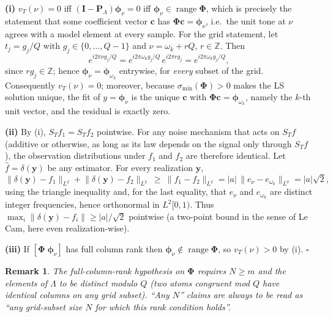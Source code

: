 \documentclass[10pt]{article}
\newtheorem{remark}{Remark}
\DeclareMathOperator{\range}{range}
\newcommand{\Z}{\mathbb{Z}}
\newcommand{\Lam}{\Lambda}
\newcommand{\Phimat}{\bm{\Phi}}
\newcommand{\norm}[1]{\lVert#1\rVert}
\newcommand{\vt}{v_T}
\begin{document}
\textbf{(i)}  $\vt(\nu)=0$ iff $(\bm I-\bm P_\Lam)\bm\phi_\nu=0$ iff
$\bm\phi_\nu\in\range\Phimat$, which is precisely the statement that some coefficient
vector $\bm c$ has $\Phimat\bm c=\bm\phi_\nu$, i.e.\ the unit tone at $\nu$ agrees with a
model element at every sample.  For the grid statement, let $t_j=g_j/Q$ with
$g_j\in\{0,\dots,Q-1\}$ and $\nu=\omega_k+rQ$, $r\in\Z$.  Then
\[
e^{i2\pi\nu g_j/Q}=e^{i2\pi\omega_k g_j/Q}\,e^{i2\pi r g_j}=e^{i2\pi\omega_k g_j/Q},
\]
since $rg_j\in\Z$; hence $\bm\phi_\nu=\bm\phi_{\omega_k}$ entrywise, for \emph{every}
subset of the grid.  Consequently $\vt(\nu)=0$; moreover, because
$\sigma_{\min}(\Phimat)>0$ makes the LS solution unique, the fit of $y=\bm\phi_\nu$ is
the unique $\bm c$ with $\Phimat\bm c=\bm\phi_{\omega_k}$, namely the $k$-th unit vector,
and the residual is exactly zero.

\textbf{(ii)}  By (i), $S_Tf_1=S_Tf_2$ pointwise.  For any noise mechanism that acts on
$S_Tf$ (additive or otherwise, as long as its law depends on the signal only through
$S_Tf$), the observation distributions under $f_1$ and $f_2$ are therefore identical.
Let $\hat f=\delta(\bm y)$ be any estimator.  For every realization $\bm y$,
\[
\norm{\delta(\bm y)-f_1}_{L^2}+\norm{\delta(\bm y)-f_2}_{L^2}
\ \ge\ \norm{f_1-f_2}_{L^2}=|a|\,\norm{e_\nu-e_{\omega_k}}_{L^2}=|a|\sqrt2,
\]
using the triangle inequality and, for the last equality, that $e_\nu$ and
$e_{\omega_k}$ are distinct integer frequencies, hence orthonormal in $L^2[0,1)$.  Thus
$\max_i\norm{\delta(\bm y)-f_i}\ge|a|/\sqrt2$ pointwise (a two-point bound in the sense
of Le Cam, here even realization-wise).

\textbf{(iii)}  If $[\Phimat\;\bm\phi_\nu]$ has full column rank then
$\bm\phi_\nu\notin\range\Phimat$, so $\vt(\nu)>0$ by (i). \hfill$\square$

\begin{remark}
The full-column-rank hypothesis on $\Phimat$ requires $N\ge m$ and the elements of
$\Lam$ to be distinct modulo $Q$ (two atoms congruent mod $Q$ have identical columns on
any grid subset).  ``Any $N$'' claims are always to be read as ``any grid-subset size
$N$ for which this rank condition holds''.
\end{remark}
\end{document}
